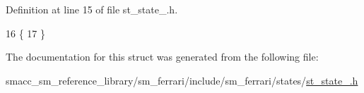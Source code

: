 Definition at line 15 of file st\+\_\+state\+\_.\+h.


\begin{DoxyCode}
16     \{
17     \}
\end{DoxyCode}


The documentation for this struct was generated from the following file\+:\begin{DoxyCompactItemize}
\item 
smacc\+\_\+sm\+\_\+reference\+\_\+library/sm\+\_\+ferrari/include/sm\+\_\+ferrari/states/\hyperlink{sm__ferrari_2include_2sm__ferrari_2states_2st__state__4_8h}{st\+\_\+state\+\_.\+h}\end{DoxyCompactItemize}
